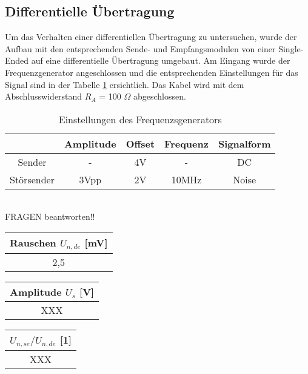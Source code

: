 \subsection{Differentielle Übertragung}
Um das Verhalten einer differentiellen Übertragung zu untersuchen, wurde der Aufbau mit den entsprechenden Sende- und Empfangsmodulen von einer Single-Ended auf eine differentielle Übertragung umgebaut. Am Eingang wurde der Frequenzgenerator angeschlossen und die entsprechenden Einstellungen für das Signal sind in der Tabelle \ref{tb:einst_diff} ersichtlich. Das Kabel wird mit dem Abschlusswiderstand $R_A$ = 100 $\Omega$ abgeschlossen.


\begin{table}[!h]
	\centering
	\begin{tabular}{|c|c|c|c|c|}
	\hline 
			& Amplitude		& Offset 	& Frequenz 		& Signalform		\\ 
	\hline 
	Sender	& -			& 4V		& -			& DC			\\ 
	\hline 
	Störsender	& 3Vpp		& 2V		& 10MHz		& Noise 		\\ 
	\hline 
	\end{tabular}
	\caption{Einstellungen des Frequenzsgenerators}
	\label{tb:einst_diff}
\end{table}
~\\
FRAGEN beantworten!!

\begin{table}[!h]
	\centering
	\begin{tabular}{|c|}
		\hline 
		Rauschen $U_{n, de}$ [mV]		\\ 
		\hline 
		2,5	\\ 
		\hline 
	\end{tabular}
\end{table}

\begin{table}[!h]
	\centering
	\begin{tabular}{|c|}
		\hline 
		Amplitude $U_s$ [V]		\\ 
		\hline 
		XXX		\\ 
		\hline 
	\end{tabular}
\end{table}

\begin{table}[!h]
	\centering
	\begin{tabular}{|c|}
		\hline 
		$U_{n, se} / U_{n, de}$ [1]		\\ 
		\hline 
		XXX		\\ 
		\hline 
	\end{tabular}
\end{table}

